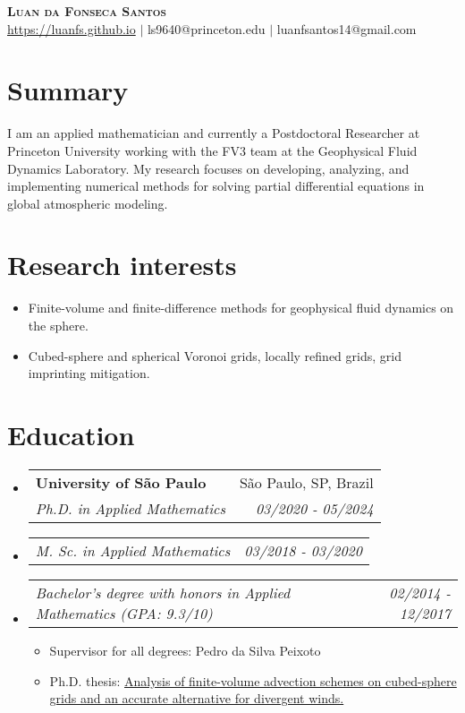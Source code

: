 \documentclass[letterpaper,11pt]{article}
\makeatletter
\newcommand{\resumeSubheading}[4]{
  \vspace{-2pt}\item
    \begin{tabular*}{0.97\textwidth}[t]{l@{\extracolsep{\fill}}r}
      \textbf{#1} & #2 \\
      \textit{\small#3} & \textit{\small #4} \\
    \end{tabular*}\vspace{-7pt}
}
\newcommand{\resumeSubSubheading}[2]{
    \item
    \begin{tabular*}{0.97\textwidth}{l@{\extracolsep{\fill}}r}
      \textit{\small#1} & \textit{\small #2} \\
    \end{tabular*}\vspace{-7pt}
}
\newcommand{\resumeSubHeadingListStart}{\begin{itemize}[leftmargin=0.15in, label={}]}
\newcommand{\resumeSubHeadingListEnd}{\end{itemize}}
\makeatother
\begin{document}
\begin{center}
    \textbf{\Huge \scshape Luan da Fonseca Santos} \\ \vspace{1pt}
    \href{https://luanfs.github.io}{https://luanfs.github.io} $|$
    ls9640@princeton.edu
    $|$  
    {luanfsantos14@gmail.com} 
\end{center}

\section{Summary}
I am an applied mathematician and currently a Postdoctoral Researcher at Princeton University working with the FV3 team at the Geophysical Fluid Dynamics Laboratory.
My research focuses on developing, analyzing, and implementing  numerical methods for solving partial differential equations in global atmospheric modeling.

\section{Research interests}
\begin{itemize}
	\item Finite-volume and finite-difference methods for geophysical fluid dynamics on the sphere.
	\item Cubed-sphere and spherical Voronoi grids, locally refined grids, grid imprinting mitigation.
\end{itemize}

\section{Education}
\resumeSubHeadingListStart
\resumeSubheading
{University of São Paulo }{São Paulo, SP, Brazil}
{Ph.D. in Applied Mathematics}{03/2020 - 05/2024}  

\resumeSubSubheading{M. Sc. in Applied Mathematics}{03/2018 - 03/2020}

\resumeSubSubheading{Bachelor's degree with honors in Applied Mathematics (GPA: 9.3/10)}{02/2014 - 12/2017}
\begin{itemize}
	\item Supervisor for all degrees: Pedro da Silva Peixoto
	\item Ph.D. thesis: \href{https://www.teses.usp.br/teses/disponiveis/45/45132/tde-29052024-125153/en.php}{Analysis of finite-volume advection
	schemes on cubed-sphere grids and an
	accurate alternative for divergent winds.}
\end{itemize}
\resumeSubHeadingListEnd
\end{document}
